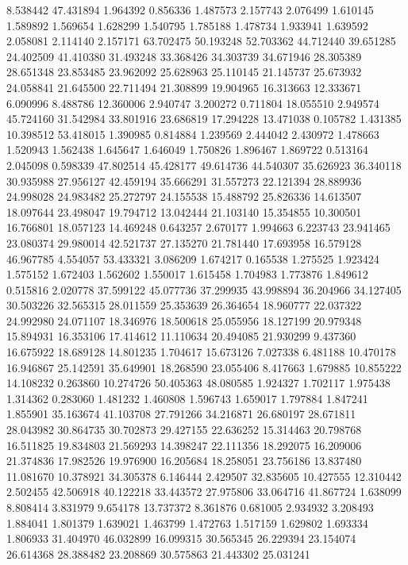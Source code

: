 8.538442
47.431894
1.964392
0.856336
1.487573
2.157743
2.076499
1.610145
1.589892
1.569654
1.628299
1.540795
1.785188
1.478734
1.933941
1.639592
2.058081
2.114140
2.157171
63.702475
50.193248
52.703362
44.712440
39.651285
24.402509
41.410380
31.493248
33.368426
34.303739
34.671946
28.305389
28.651348
23.853485
23.962092
25.628963
25.110145
21.145737
25.673932
24.058841
21.645500
22.711494
21.308899
19.904965
16.313663
12.333671
6.090996
8.488786
12.360006
2.940747
3.200272
0.711804
18.055510
2.949574
45.724160
31.542984
33.801916
23.686819
17.294228
13.471038
0.105782
1.431385
10.398512
53.418015
1.390985
0.814884
1.239569
2.444042
2.430972
1.478663
1.520943
1.562438
1.645647
1.646049
1.750826
1.896467
1.869722
0.513164
2.045098
0.598339
47.802514
45.428177
49.614736
44.540307
35.626923
36.340118
30.935988
27.956127
42.459194
35.666291
31.557273
22.121394
28.889936
24.998028
24.983482
25.272797
24.155538
15.488792
25.826336
14.613507
18.097644
23.498047
19.794712
13.042444
21.103140
15.354855
10.300501
16.766801
18.057123
14.469248
0.643257
2.670177
1.994663
6.223743
23.941465
23.080374
29.980014
42.521737
27.135270
21.781440
17.693958
16.579128
46.967785
4.554057
53.433321
3.086209
1.674217
0.165538
1.275525
1.923424
1.575152
1.672403
1.562602
1.550017
1.615458
1.704983
1.773876
1.849612
0.515816
2.020778
37.599122
45.077736
37.299935
43.998894
36.204966
34.127405
30.503226
32.565315
28.011559
25.353639
26.364654
18.960777
22.037322
24.992980
24.071107
18.346976
18.500618
25.055956
18.127199
20.979348
15.894931
16.353106
17.414612
11.110634
20.494085
21.930299
9.437360
16.675922
18.689128
14.801235
1.704617
15.673126
7.027338
6.481188
10.470178
16.946867
25.142591
35.649901
18.268590
23.055406
8.417663
1.679885
10.855222
14.108232
0.263860
10.274726
50.405363
48.080585
1.924327
1.702117
1.975438
1.314362
0.283060
1.481232
1.460808
1.596743
1.659017
1.797884
1.847241
1.855901
35.163674
41.103708
27.791266
34.216871
26.680197
28.671811
28.043982
30.864735
30.702873
29.427155
22.636252
15.314463
20.798768
16.511825
19.834803
21.569293
14.398247
22.111356
18.292075
16.209006
21.374836
17.982526
19.976900
16.205684
18.258051
23.756186
13.837480
11.081670
10.378921
34.305378
6.146444
2.429507
32.835605
10.427555
12.310442
2.502455
42.506918
40.122218
33.443572
27.975806
33.064716
41.867724
1.638099
8.808414
3.831979
9.654178
13.737372
8.361876
0.681005
2.934932
3.208493
1.884041
1.801379
1.639021
1.463799
1.472763
1.517159
1.629802
1.693334
1.806933
31.404970
46.032899
16.099315
30.565345
26.229394
23.154074
26.614368
28.388482
23.208869
30.575863
21.443302
25.031241
